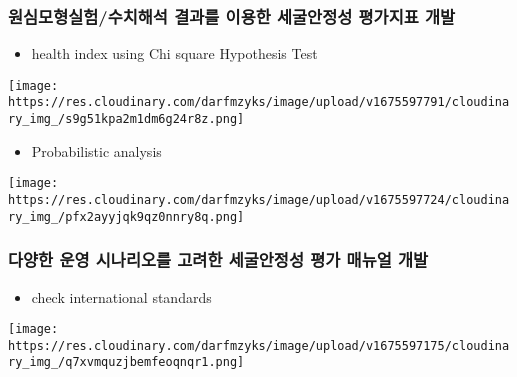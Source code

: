 \documentclass[
  letterpaper,
  DIV=11,
  numbers=noendperiod]{scrreprt}
\providecommand{\tightlist}{%
  \setlength{\itemsep}{0pt}\setlength{\parskip}{0pt}}\usepackage{longtable,booktabs,array}
\begin{document}
\hypertarget{uxc6d0uxc2ecuxbaa8uxd615uxc2e4uxd5d8uxc218uxce58uxd574uxc11d-uxacb0uxacfcuxb97c-uxc774uxc6a9uxd55c-uxc138uxad74uxc548uxc815uxc131-uxd3c9uxac00uxc9c0uxd45c-uxac1cuxbc1c}{%
\subsubsection{원심모형실험/수치해석 결과를 이용한 세굴안정성 평가지표
개발}\label{uxc6d0uxc2ecuxbaa8uxd615uxc2e4uxd5d8uxc218uxce58uxd574uxc11d-uxacb0uxacfcuxb97c-uxc774uxc6a9uxd55c-uxc138uxad74uxc548uxc815uxc131-uxd3c9uxac00uxc9c0uxd45c-uxac1cuxbc1c}}

\begin{itemize}
\tightlist
\item
  health index using Chi square Hypothesis Test
\end{itemize}

\texttt{[image: https://res.cloudinary.com/darfmzyks/image/upload/v1675597791/cloudinary\_img\_/s9g51kpa2m1dm6g24r8z.png]}

\begin{itemize}
\tightlist
\item
  Probabilistic analysis
\end{itemize}

\texttt{[image: https://res.cloudinary.com/darfmzyks/image/upload/v1675597724/cloudinary\_img\_/pfx2ayyjqk9qz0nnry8q.png]}

\hypertarget{uxb2e4uxc591uxd55c-uxc6b4uxc601-uxc2dcuxb098uxb9acuxc624uxb97c-uxace0uxb824uxd55c-uxc138uxad74uxc548uxc815uxc131-uxd3c9uxac00-uxb9e4uxb274uxc5bc-uxac1cuxbc1c}{%
\subsubsection{다양한 운영 시나리오를 고려한 세굴안정성 평가 매뉴얼
개발}\label{uxb2e4uxc591uxd55c-uxc6b4uxc601-uxc2dcuxb098uxb9acuxc624uxb97c-uxace0uxb824uxd55c-uxc138uxad74uxc548uxc815uxc131-uxd3c9uxac00-uxb9e4uxb274uxc5bc-uxac1cuxbc1c}}

\begin{itemize}
\tightlist
\item
  check international standards
\end{itemize}

\texttt{[image: https://res.cloudinary.com/darfmzyks/image/upload/v1675597175/cloudinary\_img\_/q7xvmquzjbemfeoqnqr1.png]}
\end{document}
